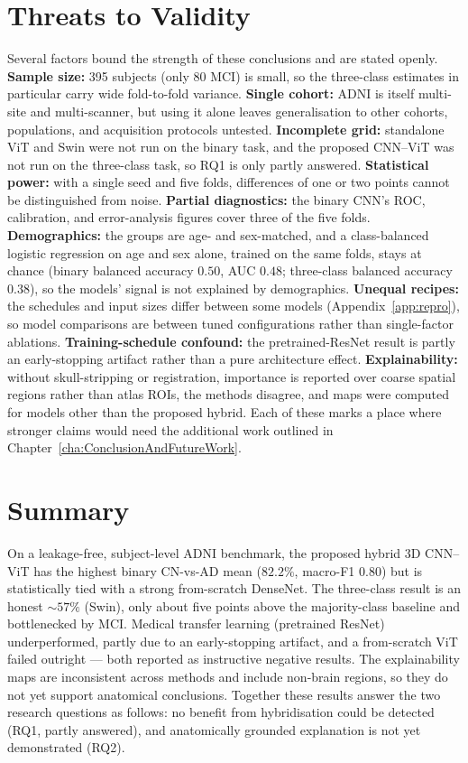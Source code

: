 \section{Threats to Validity}
Several factors bound the strength of these conclusions and are stated openly. \textbf{Sample size:} 395 subjects (only 80 MCI) is small, so the three-class estimates in particular carry wide fold-to-fold variance. \textbf{Single cohort:} ADNI is itself multi-site and multi-scanner, but using it alone leaves generalisation to other cohorts, populations, and acquisition protocols untested. \textbf{Incomplete grid:} standalone ViT and Swin were not run on the binary task, and the proposed CNN--ViT was not run on the three-class task, so RQ1 is only partly answered. \textbf{Statistical power:} with a single seed and five folds, differences of one or two points cannot be distinguished from noise. \textbf{Partial diagnostics:} the binary CNN's ROC, calibration, and error-analysis figures cover three of the five folds. \textbf{Demographics:} the groups are age- and sex-matched, and a class-balanced logistic regression on age and sex alone, trained on the same folds, stays at chance (binary balanced accuracy $0.50$, AUC $0.48$; three-class balanced accuracy $0.38$), so the models' signal is not explained by demographics. \textbf{Unequal recipes:} the schedules and input sizes differ between some models (Appendix~\ref{app:repro}), so model comparisons are between tuned configurations rather than single-factor ablations. \textbf{Training-schedule confound:} the pretrained-ResNet result is partly an early-stopping artifact rather than a pure architecture effect. \textbf{Explainability:} without skull-stripping or registration, importance is reported over coarse spatial regions rather than atlas ROIs, the methods disagree, and maps were computed for models other than the proposed hybrid. Each of these marks a place where stronger claims would need the additional work outlined in Chapter~\ref{cha:ConclusionAndFutureWork}.

\section{Summary}
On a leakage-free, subject-level ADNI benchmark, the proposed hybrid 3D CNN--ViT has the highest binary CN-vs-AD mean ($82.2\%$, macro-F1 $0.80$) but is statistically tied with a strong from-scratch DenseNet. The three-class result is an honest $\sim\!57\%$ (Swin), only about five points above the majority-class baseline and bottlenecked by MCI. Medical transfer learning (pretrained ResNet) underperformed, partly due to an early-stopping artifact, and a from-scratch ViT failed outright --- both reported as instructive negative results. The explainability maps are inconsistent across methods and include non-brain regions, so they do not yet support anatomical conclusions. Together these results answer the two research questions as follows: no benefit from hybridisation could be detected (RQ1, partly answered), and anatomically grounded explanation is not yet demonstrated (RQ2).
